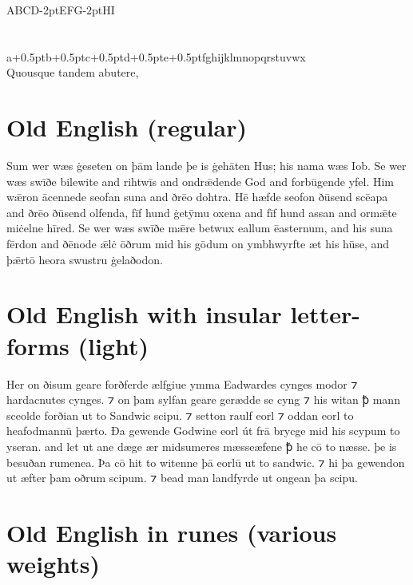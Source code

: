 \documentclass[12pt,letterpaper,openany]{book}
\begin{document}
{\fontsize{72pt}{72pt}\selectfont ABCD\kern-2ptEFG\kern-2ptHI\\[0.3ex]
\fontsize{58}{58}\selectfont{}\\[0.1ex]
\fontsize{48}{48}\selectfont{}\\[0.4ex]
\fontsize{36}{36}\selectfont{}a\kern+0.5ptb\kern+0.5ptc\kern+0.5ptd\kern+0.5pte\kern+0.5ptfghijklmnopqrstuvwx\\[0.1ex]
Quousque tandem abutere, \linebreak
\italslanted {}\linebreak
{} }


\section{Old English (regular)}

{\large Sum wer wæs ġeseten on þām lande þe is ġehāten Hus; his nama wæs Iob. Se wer wæs swīðe bilewite and rihtwīs and ondrǣdende God and forbūgende yfel. Him wǣron ācennede seofan suna and ðrēo dohtra. Hē hæfde seofon ðūsend scēapa and ðrēo ðūsend olfenda, fīf hund ġetȳmu oxena and fīf hund assan and ormǣte miċelne hīred. Se wer wæs swīðe mǣre betwux eallum ēasternum, and his suna fērdon and ðēnode ǣlċ ōðrum mid his gōdum on ymbhwyrfte æt his hūse, and þǣrtō heora swustru ġelaðodon.}

\section{Old English with insular letter-forms (light)}

{\large\light{}Her on ðisum geare forðferde ælfgiue ymma Eadwardes cynges modor ⁊ hardacnutes cynges. ⁊ on þam sylfan geare gerædde se cyng ⁊ his witan ꝥ mann sceolde forðian ut to Sandwic scipu. ⁊ setton raulf eorl ⁊ oddan eorl to heafodmannū þærto. Ða gewende Godwine eorl út frā brycge mid his scypum to yseran. and let ut ane dæge ær midsumeres mæsseæfene ꝥ he cō to næsse. þe is besuðan rumenea. Þa cō hit to witenne þā eorlū ut to sandwic. ⁊ hi þa gewendon ut æfter þam oðrum scipum. ⁊ bead man landfyrde ut ongean þa scipu.}

\section{Old English in runes (various weights)}
\end{document}
